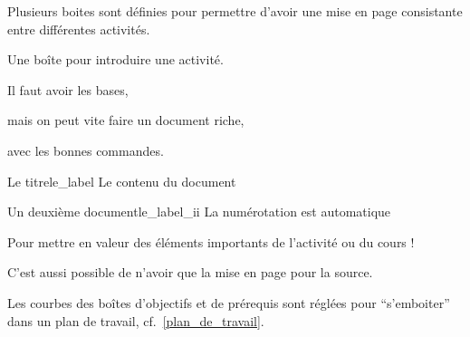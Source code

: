 \documentclass[12pt]{extarticle}
\begin{document}
Plusieurs boites sont définies pour permettre d'avoir une mise en page consistante entre différentes activités.
\begin{boiteCodeTex}{}
  \begin{contexte}
    Une boîte pour introduire une activité.
  \end{contexte}

  \begin{prerequis}
    \item Il faut avoir les bases,
  \end{prerequis}

  \begin{objectifs}
    \item mais on peut vite faire un document riche,
    \item avec les bonnes commandes.
  \end{objectifs}

  \begin{doc}{Le titre}{le_label}
    Le contenu du document
  \end{doc}

  \begin{doc}{Un deuxième document}{le_label_ii}
    La numérotation est automatique
  \end{doc}

  \begin{importants}
    Pour mettre en valeur des éléments importants de l'activité ou du cours !
  \end{importants}

  C'est aussi possible de n'avoir que la mise en page pour la source.
\end{boiteCodeTex}

Les courbes des boîtes d'objectifs et de prérequis sont réglées pour ``s'emboiter'' dans un plan de travail, cf.~\ref{plan_de_travail}.
\end{document}
